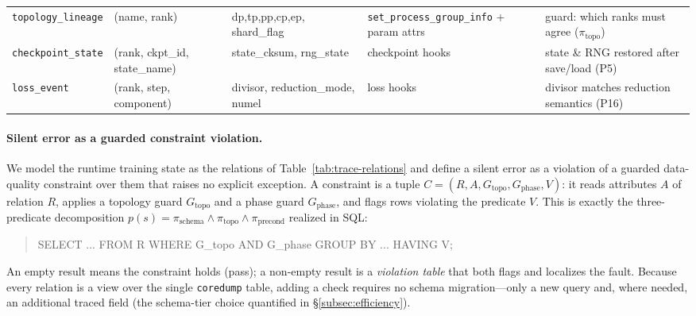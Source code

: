 \begin{table}[t]
\begin{tabular}{@{}lllll@{}}
\texttt{topology\_lineage}& (name, rank)                        & dp,tp,pp,cp,ep, shard\_flag & \texttt{set\_process\_group\_info} + param attrs & guard: which ranks must agree ($\pi_{\text{topo}}$) \\
\texttt{checkpoint\_state}& (rank, ckpt\_id, state\_name)       & state\_cksum, rng\_state & checkpoint hooks & state \& RNG restored after save/load (P5) \\
\texttt{loss\_event}      & (rank, step, component)             & divisor, reduction\_mode, numel & loss hooks & divisor matches reduction semantics (P16) \\
\bottomrule
\end{tabular}
\end{table}

\paragraph{Silent error as a guarded constraint violation.}
We model the runtime training state as the relations of Table~\ref{tab:trace-relations} and define a silent error as a violation of a guarded data-quality constraint over them that raises no explicit exception. A constraint is a tuple $C = (R, A, G_{\text{topo}}, G_{\text{phase}}, V)$: it reads attributes $A$ of relation $R$, applies a topology guard $G_{\text{topo}}$ and a phase guard $G_{\text{phase}}$, and flags rows violating the predicate $V$. This is exactly the three-predicate decomposition $p(s) = \pi_{\text{schema}} \wedge \pi_{\text{topo}} \wedge \pi_{\text{precond}}$ realized in SQL:
\begin{quote}\small\ttfamily
SELECT ... FROM R WHERE G\_topo AND G\_phase GROUP BY ... HAVING V;
\end{quote}
An empty result means the constraint holds (pass); a non-empty result is a \emph{violation table} that both flags and localizes the fault. Because every relation is a view over the single \texttt{coredump} table, adding a check requires no schema migration---only a new query and, where needed, an additional traced field (the schema-tier choice quantified in \S\ref{subsec:efficiency}).

